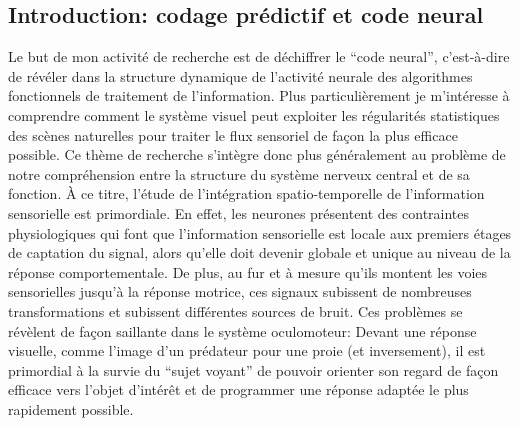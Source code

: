 
\subsection{Introduction: codage prédictif et code neural}%
Le but de mon activité de recherche est de déchiffrer le ``code neural'', c'est-à-dire de révéler dans la structure dynamique de l'activité neurale des algorithmes fonctionnels de traitement de l'information. Plus particulièrement je m'intéresse à comprendre comment le système visuel peut exploiter les régularités statistiques des scènes naturelles pour traiter le flux sensoriel de façon la plus efficace possible. Ce thème de recherche s'intègre donc plus généralement au problème de notre compréhension entre la structure du système nerveux central et de sa fonction. %
%
À ce titre, l'étude de l'intégration spatio-temporelle de l'information sensorielle est primordiale. En effet, les neurones présentent des contraintes physiologiques qui font que l'information sensorielle est locale aux premiers étages de captation du signal, alors qu'elle doit devenir globale et unique au niveau de la réponse comportementale. De plus, au fur et à mesure qu'ils montent les voies sensorielles jusqu'à la réponse motrice, ces signaux subissent de nombreuses transformations et subissent différentes sources de bruit. Ces problèmes se révèlent de façon saillante dans le système oculomoteur: Devant une réponse visuelle, comme l'image d'un prédateur pour une proie (et inversement), il est primordial à la survie du ``sujet voyant'' de pouvoir orienter son regard de façon efficace vers l'objet d'intérêt et de programmer une réponse adaptée le plus rapidement possible. %

